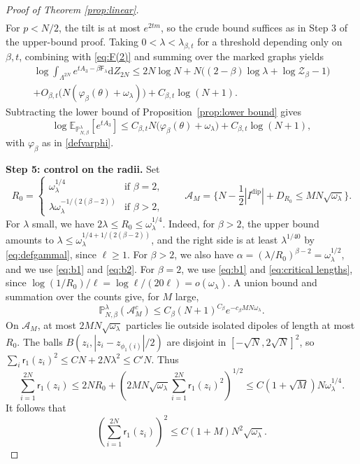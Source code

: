 \documentclass[a4paper,10pt,leqno]{amsart}
\numberwithin{equation}{section}
\newcommand{\dd}{\mathrm{d}}
\def\Esp{\mathbb{E}}
\def\mc{\mathcal}
\def\P{\mathbb{P}_{N,\beta}^{\lambda}}
\def\F{\mathsf{F}}
\def\rr{\mathsf{r}}
\newcommand{\dip}{\mathrm{dip}}
\begin{document}
\begin{proof}[Proof of Theorem \ref{prop:linear}]
\begin{multline*}
  \end{multline*}
  For $p<N/2$, the tilt is at most $e^{2tm}$, so the crude bound suffices as in Step 3 of the upper-bound proof. Taking $0<\lambda<\lambda_{\beta,t}$ for a threshold depending only on $\beta,t$, combining with \eqref{eq:F(2)} and summing over the marked graphs yields
  \begin{multline*}
    \log\int_{\Lambda^{2N}} e^{tA_3-\beta\F_\lambda}\dd Z_{2N}
    \le2N\log N+N\bigl((2-\beta)\log\lambda+\log\mc Z_\beta-1\bigr)\\
    +O_{\beta,t}\bigl(N(\varphi_\beta(\theta)+\omega_\lambda)\bigr)+C_{\beta,t}\log(N+1).
  \end{multline*}
  Subtracting the lower bound of Proposition~\ref{prop:lower bound} gives
  \begin{equation}\label{eq:finalA3}
    \log\Esp_{\P}[e^{tA_3}]
    \le C_{\beta,t}N\bigl(\varphi_\beta(\theta)+\omega_\lambda\bigr)+C_{\beta,t}\log(N+1),
  \end{equation}
  with $\varphi_\beta$ as in \eqref{defvarphi}.

  \smallskip
  \noindent
  \textbf{Step 5: control on the radii.} Set
  \[
    R_0=\begin{cases}
      \omega_\lambda^{1/4}&\text{if $\beta=2$},\\
      \lambda\omega_\lambda^{-1/(2(\beta-2))}&\text{if $\beta>2$},
    \end{cases}
    \qquad
    \mc A_M=\{N-\frac12|I^{\dip}|+D_{R_0}\le MN\sqrt{\omega_\lambda}\}.
  \]
  For $\lambda$ small, we have $2\lambda\le R_0\le\omega_\lambda^{1/4}$. Indeed, for $\beta>2$, the upper bound amounts to $\lambda\le\omega_\lambda^{1/4+1/(2(\beta-2))}$, and the right side is at least $\lambda^{1/40}$ by \eqref{eq:defgammal}, since $\ell\ge1$. For $\beta>2$, we also have $\alpha=(\lambda/R_0)^{\beta-2}=\omega_\lambda^{1/2}$, and we use \eqref{eq:b1} and \eqref{eq:b2}. For $\beta=2$, we use \eqref{eq:b1} and \eqref{eq:critical lengths}, since $\log(1/R_0)/\ell=\log\ell/(20\ell)=o(\omega_\lambda)$. A union bound and summation over the counts give, for $M$ large,
  \begin{equation}\label{eq:PAM}
    \P(\mc A_M^c)\le C_\beta(N+1)^{C_\beta}e^{-c_\beta MN\omega_\lambda}.
  \end{equation}
  On $\mc A_M$, at most $2MN\sqrt{\omega_\lambda}$ particles lie outside isolated dipoles of length at most $R_0$. The balls $B(z_i,|z_i-z_{\phi_1(i)}|/2)$ are disjoint in $[-\sqrt N,2\sqrt N]^2$, so $\sum_i\rr_1(z_i)^2\le CN+2N\lambda^2\le C'N$. Thus
  \[
    \sum_{i=1}^{2N}\rr_1(z_i)
    \le2NR_0+\left(2MN\sqrt{\omega_\lambda}\sum_{i=1}^{2N}\rr_1(z_i)^2\right)^{1/2}
    \le C(1+\sqrt M)N\omega_\lambda^{1/4}.
  \]
  It follows that
  \begin{equation}\label{eq:sumrr1}
    \left(\sum_{i=1}^{2N}\rr_1(z_i)\right)^2\le C(1+M)N^2\sqrt{\omega_\lambda}.
  \end{equation}


\end{proof}
\end{document}
